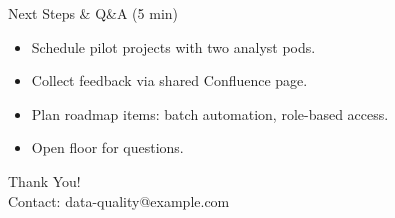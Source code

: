 \documentclass[aspectratio=169]{beamer}
\begin{document}
\begin{frame}{Next Steps \& Q\&A (5 min)}
  \begin{itemize}
    \item Schedule pilot projects with two analyst pods.
    \item Collect feedback via shared Confluence page.
    \item Plan roadmap items: batch automation, role-based access.
    \item Open floor for questions.
  \end{itemize}
\end{frame}

\begin{frame}[plain]
  \centering
  \Huge{Thank You!}
  \\[1ex]
  \large{Contact: data-quality@example.com}
\end{frame}
\end{document}
